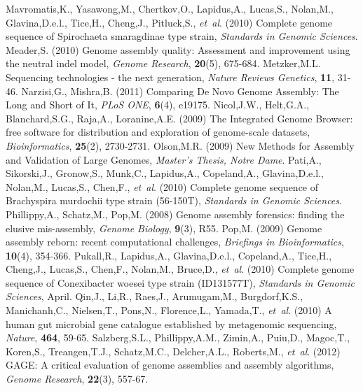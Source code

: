 \documentclass[phd,tocprelim]{cornell}
\begin{document}
\begin{thebibliography}{}
 Mavromatis,K., Yasawong,M., Chertkov,O., Lapidus,A., Lucas,S., Nolan,M., Glavina,D.e.l., Tice,H., Cheng,J., Pitluck,S., {\it et~al}. (2010) Complete genome sequence of Spirochaeta smaragdinae type strain, {\it Standards in Genomic Sciences}.
 Meader,S. (2010) Genome assembly quality: Assessment and improvement using the neutral indel model, {\it Genome Research}, {\bf 20}(5), 675-684.
 Metzker,M.L. Sequencing technologies - the next generation, {\it Nature Reviews Genetics}, {\bf 11}, 31-46.
 Narzisi,G., Mishra,B. (2011) Comparing De Novo Genome Assembly: The Long and Short of It, {\it PLoS ONE}, {\bf 6}(4), e19175.
 Nicol,J.W., Helt,G.A., Blanchard,S.G., Raja,A., Loranine,A.E. (2009) The Integrated Genome Browser: free software for distribution and exploration of genome-scale datasets, {\it Bioinformatics}, {\bf 25}(2), 2730-2731.
 Olson,M.R. (2009) New Methods for Assembly and Validation of Large Genomes, {\it Master's Thesis, Notre Dame}.
 Pati,A., Sikorski,J., Gronow,S., Munk,C., Lapidus,A., Copeland,A., Glavina,D.e.l., Nolan,M., Lucas,S., Chen,F., {\it et~al}. (2010) Complete genome sequence of Brachyspira murdochii type strain (56-150T), {\it Standards in Genomic Sciences}.
 Phillippy,A., Schatz,M., Pop,M. (2008) Genome assembly forensics: finding the elusive mis-assembly, {\it Genome Biology}, {\bf 9}(3), R55.
 Pop,M. (2009) Genome assembly reborn: recent computational challenges, {\it Briefings in Bioinformatics}, {\bf 10}(4), 354-366.
 Pukall,R., Lapidus,A., Glavina,D.e.l., Copeland,A., Tice,H., Cheng,J., Lucas,S., Chen,F., Nolan,M., Bruce,D., {\it et~al}. (2010) Complete genome sequence of Conexibacter woesei type strain (ID131577T), {\it Standards in Genomic Sciences}, April.
 Qin,J., Li,R., Raes,J., Arumugam,M., Burgdorf,K.S., Manichanh,C., Nielsen,T., Pons,N., Florence,L., Yamada,T., {\it et~al}. (2010) A human gut microbial gene catalogue established by metagenomic sequencing, {\it Nature}, {\bf 464}, 59-65.
 Salzberg,S.L., Phillippy,A.M., Zimin,A., Puiu,D., Magoc,T., Koren,S., Treangen,T.J., Schatz,M.C., Delcher,A.L., Roberts,M., {\it et~al}. (2012)  GAGE: A critical evaluation of genome assemblies and assembly algorithms, {\it Genome Research}, {\bf 22}(3), 557-67.

\end{thebibliography}
\end{document}
